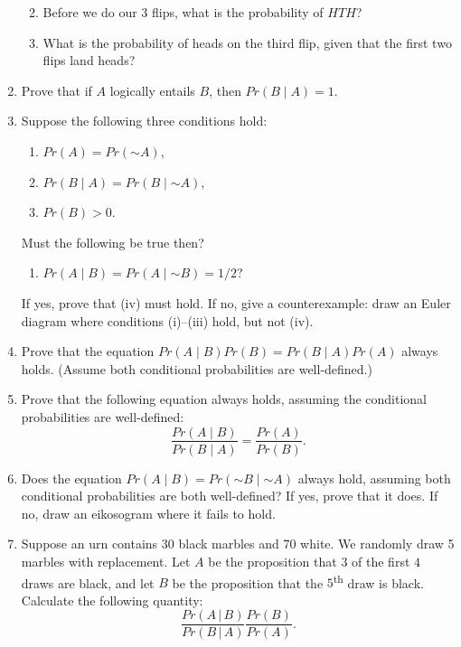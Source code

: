 \documentclass[justified]{tufte-book}
\providecommand{\tightlist}{%
  \setlength{\itemsep}{0pt}\setlength{\parskip}{0pt}}
\newcommand{\given}{\mid}
\renewcommand{\neg}{\mathbin{\sim}}
\newcommand{\p}{Pr}
\theoremstyle{definition}
\theoremstyle{definition}
\theoremstyle{definition}
\theoremstyle{definition}
\theoremstyle{remark}
\begin{document}
\begin{enumerate}
  \begin{enumerate}
  \def\labelenumii{\alph{enumii}.}
  \tightlist
  \item
    Before we do our \(3\) flips, what is the probability of \(HTH\)?
  \item
    What is the probability of heads on the third flip, given that the first two flips land heads?
  \end{enumerate}
\item
  Prove that if \(A\) logically entails \(B\), then \(\p(B \given A) = 1\).
\item
  Suppose the following three conditions hold:

  \begin{enumerate}
  \def\labelenumii{\roman{enumii}.}
  \tightlist
  \item
    \(\p(A) = \p(\neg A)\),
  \item
    \(\p(B \given A) = \p(B \given \neg A)\),
  \item
    \(\p(B) > 0\).
  \end{enumerate}

  Must the following be true then?

  \begin{enumerate}
  \def\labelenumii{\roman{enumii}.}
  \setcounter{enumii}{3}
  \tightlist
  \item
    \(\p(A \given B) = \p(A \given \neg B) = 1/2\)?
  \end{enumerate}

  If yes, prove that (iv) must hold. If no, give a counterexample: draw an Euler diagram where conditions (i)--(iii) hold, but not (iv).
\item
  Prove that the equation \(\p(A \given B) \p(B) = \p(B \given A) \p(A)\) always holds. (Assume both conditional probabilities are well-defined.)
\item
  Prove that the following equation always holds, assuming the conditional probabilities are well-defined:
  \[ \frac{\p(A \given B)}{\p(B \given A)} = \frac{\p(A)}{\p(B)}. \]
\item
  Does the equation \(\p(A \given B) = \p(\neg B \given \neg A)\) always hold, assuming both conditional probabilities are both well-defined? If yes, prove that it does. If no, draw an eikosogram where it fails to hold.
\item
  Suppose an urn contains 30 black marbles and 70 white. We randomly draw 5 marbles with replacement. Let \(A\) be the proposition that \(3\) of the first \(4\) draws are black, and let \(B\) be the proposition that the \(5\)\textsuperscript{th} draw is black. Calculate the following quantity:
  \[ \frac{Pr(A \,\vert\, B)}{Pr(B \,\vert\, A)} \frac{Pr(B)}{Pr(A)}. \]
\end{enumerate}
\end{document}
